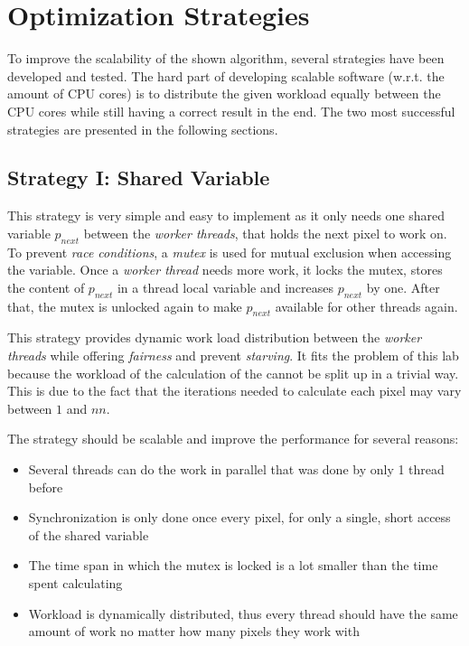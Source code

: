 \section{Optimization Strategies}
\label{sec:strategies}

To improve the scalability of the shown algorithm, several strategies have been developed and tested. The hard part of developing scalable software (w.r.t. the amount of CPU cores) is to distribute the given workload equally between the CPU cores while still having a correct result in the end. The two most successful strategies are presented in the following sections.

\subsection{Strategy I: Shared Variable}
\label{ssec:strategy-i}

This strategy is very simple and easy to implement as it only needs one shared variable $p_{next}$ between the \textit{worker threads}, that holds the next pixel to work on. To prevent \textit{race conditions}, a \textit{mutex} is used for mutual exclusion when accessing the variable. Once a \textit{worker thread} needs more work, it locks the mutex, stores the content of $p_{next}$ in a thread local variable and increases $p_{next}$ by one. After that, the mutex is unlocked again to make $p_{next}$ available for other threads again.

This strategy provides dynamic work load distribution between the \textit{worker threads} while offering \textit{fairness} and prevent \textit{starving}. It fits the problem of this lab because the workload of the calculation of the \ms{} cannot be split up in a trivial way. This is due to the fact that the iterations needed to calculate each pixel may vary between $1$ and $nn$.

\noindent The strategy should be scalable and improve the performance for several reasons:
\begin{itemize}
    \item Several threads can do the work in parallel that was done by only 1 thread before
    \item Synchronization is only done once every pixel, for only a single, short access of the shared variable
    \item The time span in which the mutex is locked is a lot smaller than the time spent calculating
    \item Workload is dynamically distributed, thus every thread should have the same amount of work no matter how many pixels they work with
\end{itemize}


